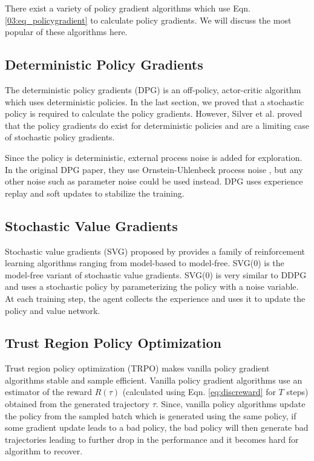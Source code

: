 There exist a variety of policy gradient algorithms which use Eqn. \ref{03:eq_policygradient} to calculate policy gradients. We will discuss the most popular of these algorithms here.

\subsection{Deterministic Policy Gradients}
The deterministic policy gradients (DPG) \cite{silver2014deterministic} is an off-policy, actor-critic algorithm which uses deterministic policies. In the last section, we proved that a stochastic policy is required to calculate the policy gradients. However, Silver et al. proved that the policy gradients do exist for deterministic policies and are a limiting case of stochastic policy gradients.

Since the policy is deterministic, external process noise is added for exploration. In the original DPG paper, they use Ornstein-Uhlenbeck process noise \cite{ounoise}, but any other noise such as parameter noise \cite{paramnoise} could be used instead. DPG uses experience replay and soft updates to stabilize the training. 

\subsection{Stochastic Value Gradients}
Stochastic value gradients (SVG) proposed by \cite{svg} provides a family of reinforcement learning algorithms ranging from model-based to model-free. SVG(0) is the model-free variant of stochastic value gradients. SVG(0) is very similar to DDPG and uses a stochastic policy by parameterizing the policy with a noise variable. At each training step, the agent collects the experience and uses it to update the policy and value network.


\subsection{Trust Region Policy Optimization}
Trust region policy optimization (TRPO) \cite{schulman2015trust} makes vanilla policy gradient algorithms stable and sample efficient. Vanilla policy gradient algorithms use an estimator of the reward $R(\tau)$ (calculated using Eqn. \ref{eq:discreward} for $T$ steps) obtained from the generated trajectory $\tau$. Since, vanilla policy algorithms update the policy from the sampled batch which is generated using the same policy, if some gradient update leads to a bad policy, the bad policy will then generate bad trajectories leading to further drop in the performance and it becomes hard for algorithm to recover.

